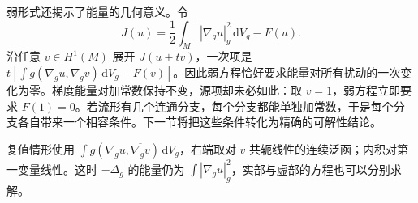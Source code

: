 弱形式还揭示了能量的几何意义。令
\[
 J(u)=\frac12\int_M|\nabla_g u|_g^2\,\mathrm dV_g-F(u).
\]
沿任意 \(v\in H^1(M)\) 展开 \(J(u+tv)\)，一次项是
\(t[\int g(\nabla_g u,\nabla_g v)\,\mathrm dV_g-F(v)]\)。因此弱方程恰好要求能量对所有扰动的一次变化为零。梯度能量对加常数保持不变，源项却未必如此：取 \(v=1\)，弱方程立即要求 \(F(1)=0\)。若流形有几个连通分支，每个分支都能单独加常数，于是每个分支各自带来一个相容条件。下一节将把这些条件转化为精确的可解性结论。

复值情形使用 \(\int g(\nabla_g u,\overline{\nabla_g v})\,\mathrm dV_g\)，右端取对 \(v\) 共轭线性的连续泛函；内积对第一变量线性。这时 \(-\Delta_g\) 的能量仍为 \(\int|\nabla_g u|_g^2\)，实部与虚部的方程也可以分别求解。
